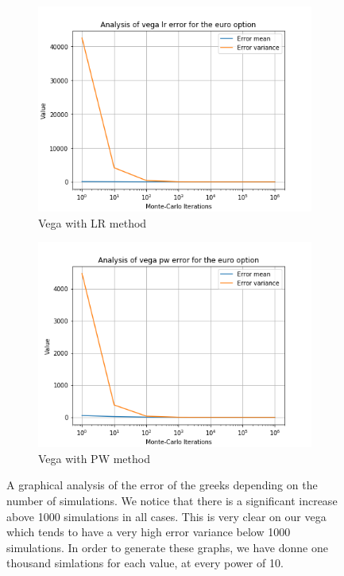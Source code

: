 \documentclass[12pt,a4paper,fleqn]{article}
\begin{document}
\begin{figure}
      \begin{subfigure}[b]{0.45\textwidth}
          \includegraphics[width=\textwidth]{graphs/eurovegalr.png}
          \caption{Vega with LR method}
      \end{subfigure}
      \begin{subfigure}[b]{0.45\textwidth}
          \includegraphics[width=\textwidth]{graphs/eurovegapw.png}
          \caption{Vega with PW method}
      \end{subfigure}

      \caption{\label{fig:eurographs}A graphical analysis of the error of the greeks depending on the number of simulations. We notice that there is a significant increase above 1000 simulations in all cases. This is very clear on our vega which tends to have a very high error variance below 1000 simulations. In order to generate these graphs, we have donne one thousand simlations for each value, at every power of 10.}


\end{figure}
\end{document}
